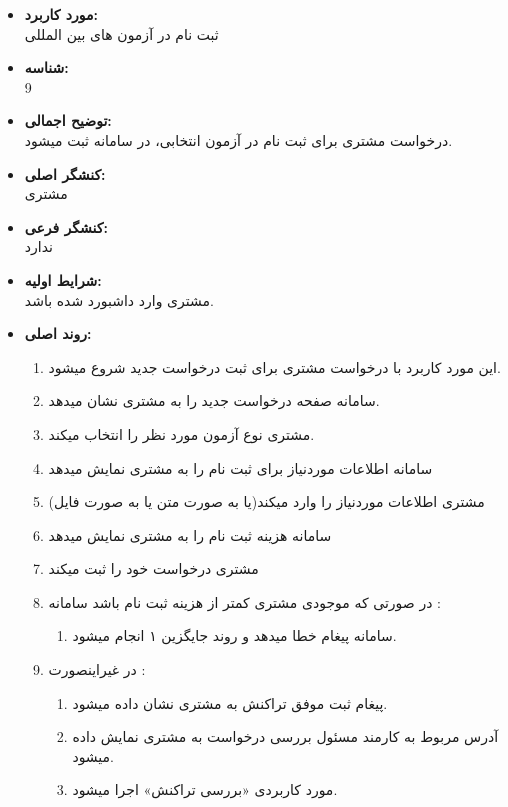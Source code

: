\documentclass{article}
\begin{document}
\noindent\makebox[\linewidth]{\rule{\paperwidth}{0.4pt}}

\begin{itemize}
\item \textbf{مورد کاربرد:}\\
ثبت نام در آزمون های بین المللی
\item \textbf{شناسه:}\\
9
\item \textbf{توضیح اجمالی:}\\
درخواست مشتری برای ثبت نام در آزمون انتخابی، در سامانه ثبت میشود.
\item \textbf{کنشگر اصلی:}\\
مشتری
\item \textbf{کنشگر فرعی:}\\
ندارد
\item \textbf{شرایط اولیه:}\\
مشتری وارد داشبورد شده باشد.
\item \textbf{روند اصلی:}\\
\begin{enumerate}
\item  این مورد کاربرد با درخواست مشتری برای ثبت درخواست جدید شروع میشود.
\item سامانه صفحه درخواست جدید را به مشتری نشان میدهد.
\item مشتری نوع آزمون مورد نظر را انتخاب میکند.
\item سامانه اطلاعات موردنیاز برای ثبت نام را به مشتری نمایش میدهد
\item مشتری اطلاعات موردنیاز را وارد میکند(یا به صورت متن یا به صورت فایل)
\item سامانه هزینه ثبت نام را به مشتری نمایش میدهد
\item مشتری درخواست خود را ثبت میکند
\item در صورتی که موجودی مشتری کمتر از هزینه ثبت نام باشد سامانه :
\begin{enumerate}
\item سامانه پیغام خطا میدهد و روند جایگزین ۱ انجام میشود. 
\end{enumerate}

\item در غیراینصورت	:
\begin{enumerate}
\item پیغام ثبت موفق تراکنش به مشتری نشان داده میشود.
\item آدرس مربوط به کارمند مسئول بررسی درخواست به مشتری نمایش داده میشود.
\item مورد کاربردی «بررسی تراکنش» اجرا میشود.
\end{enumerate}


\end{enumerate}
\end{itemize}
\end{document}
